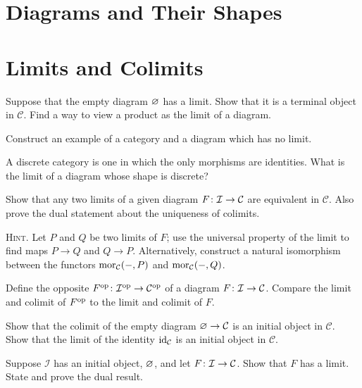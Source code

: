 
\section{Diagrams and Their Shapes}


\section{Limits and Colimits}

\bx
Suppose that the empty diagram $\varnothing$ has a limit. Show that it is a terminal object in $\mathcal{C}$. Find a way to view a product as the limit of a diagram.
\ex

\bs
\es

\bx
\ben[label=(\alph*)]
\item Construct an example of a category and a diagram which has no limit.
\item A discrete category is one in which the only morphisms are identities. What is the limit of a diagram whose shape is discrete?
\een
\ex

\bs
\ben[label=(\alph*)]
\item  
\item 
\een
\es

\bp
Show that any two limits of a given diagram $F \colon \mathcal{I} \to \mathcal{C}$ are equivalent in $\mathcal{C}$. Also prove the dual statement about the uniqueness of colimits.

{\scshape Hint.} Let $P$ and $Q$ be two limits of $F$; use the universal property of the limit to find maps $P \to Q$ and $Q \to P$. Alternatively, construct a natural isomorphism between the functors $\operatorname{mor}_{\mathcal{C}}( - , P)$ and $\operatorname{mor}_{\mathcal{C}}( -,Q)$.
\ep

\bs
\es

\bx
Define the opposite $F^{\mathrm{op}} \colon \mathcal{I}^{\mathrm{op}} \to \mathcal{C}^{\mathrm{op}}$ of a diagram $F \colon\mathcal{I} \to\mathcal{C}$. Compare the limit and colimit of $F^{\mathrm{op}}$ to the limit and colimit of $F$.
\ex

\bs
\es

\bx
Show that the colimit of the empty diagram $\varnothing \to \mathcal{C}$ is an initial object in $\mathcal{C}$. Show that the limit of the identity $\mathrm{id}_\mathcal{C}$ is an initial object in $\mathcal{C}$.
\ex

\bs
\es

\bx
Suppose $\mathcal{I}$ has an initial object, $\varnothing$, and let $F \colon \mathcal{I} \to \mathcal{C}$. Show that $F$ has a limit. State and prove the dual result.
\ex

